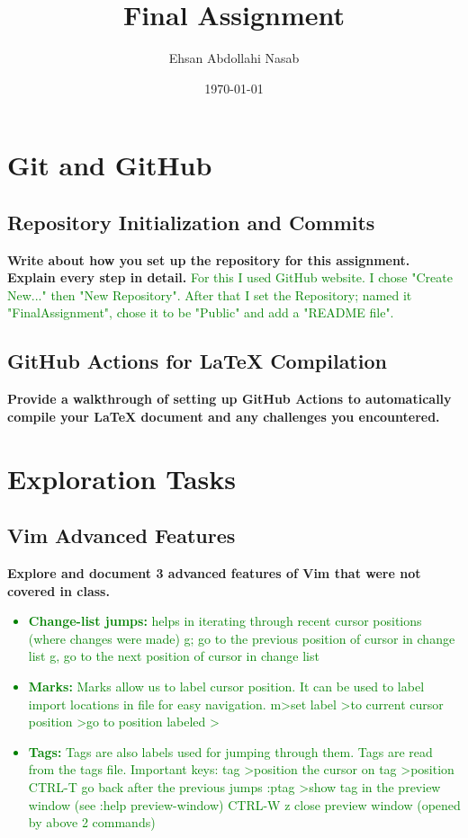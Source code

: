 \documentclass{article}
\title{Final Assignment}
\author{Ehsan Abdollahi Nasab}
\date{\today}
\begin{document}
    \maketitle

    \section{Git and GitHub}
    \subsection{Repository Initialization and Commits}
    \textbf{Write about how you set up the repository for this assignment. Explain every step in detail.}
    \textcolor{green}{
        For this I used GitHub website. I chose "Create New..." then "New Repository". After that I set the Repository; named it "FinalAssignment", chose it to be "Public" and add a "README file".}
    \subsection{GitHub Actions for LaTeX Compilation}
    \textbf{Provide a walkthrough of setting up GitHub Actions to automatically compile your LaTeX document and any challenges you encountered.}
    \textcolor{green}{}

    \section{Exploration Tasks}
    \subsection{Vim Advanced Features}
    \textbf{Explore and document 3 advanced features of Vim that were not covered in class.}
    \textcolor{green}{\begin{itemize}
        \item \textbf{Change-list jumps:} helps in iterating through recent cursor positions (where changes were made)
        g; go to the previous position of cursor in change list
        g, go to the next position of cursor in change list
        \item \textbf{Marks:} Marks allow us to label cursor position. It can be used to label import
        locations in file for easy navigation.
        m\textlesschar\textgreater set label \textlesschar\textgreater to current cursor position
        \textlesschar\textgreater go to position labeled \textlesschar\textgreater
        \item \textbf{Tags:} Tags are also labels used for jumping through them. Tags are read from the
        tags file.
        Important keys:
        tag \textlesstagname\textgreater position the cursor on tag \textlesstagname\textgreater position
        CTRL-T go back after the previous jumps
        :ptag \textlesstagname\textgreater show tag in the preview window (see :help preview-window)
        CTRL-W z close preview window (opened by above 2 commands)\end{itemize}
    }
\end{document}
